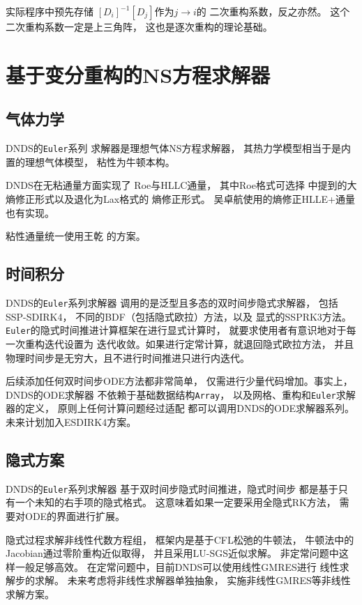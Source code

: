 \documentclass[UTF8,zihao=5]{ctexart} %
\begin{document}
实际程序中预先存储
$[D_i]^{-1}[D_j]$作为$j\rightarrow i$的
二次重构系数，反之亦然。
这个二次重构系数一定是上三角阵，
这也是逐次重构的理论基础。



\section{基于变分重构的NS方程求解器}

\subsection{气体力学}

DNDS的\verb|Euler|系列
求解器是理想气体NS方程求解器，
其热力学模型相当于是内置的理想气体模型，
粘性为牛顿本构。

DNDS在无粘通量方面实现了
Roe与HLLC通量\cite{toro2013Riemann}，
其中Roe格式可选择\cite{fleischmann2020low}
中提到的大熵修正形式以及退化为Lax格式的
熵修正形式。
吴卓航使用的熵修正HLLE+通量也有实现。

粘性通量统一使用王乾
的方案\cite{wang2016compact2}。

\subsection{时间积分}

DNDS的\verb|Euler|系列求解器
调用的是泛型且多态的双时间步隐式求解器，
包括SSP-SDIRK4\cite{ferracina2008strong}，
不同的BDF（包括隐式欧拉）方法，以及
显式的SSPRK3方法。
\verb|Euler|的隐式时间推进计算框架在进行显式计算时，
就要求使用者有意识地对于每一次重构迭代设置为
迭代收敛。如果进行定常计算，就退回隐式欧拉方法，
并且物理时间步是无穷大，且不进行时间推进只进行内迭代。

后续添加任何双时间步ODE方法都非常简单，
仅需进行少量代码增加。事实上，DNDS的ODE求解器
不依赖于基础数据结构\verb|Array|，
以及网格、重构和\verb|Euler|求解器的定义，
原则上任何计算问题经过适配
都可以调用DNDS的ODE求解器系列。
未来计划加入ESDIRK4方案。

\subsection{隐式方案}

DNDS的\verb|Euler|系列求解器
基于双时间步隐式时间推进，隐式时间步
都是基于只有一个未知的右手项的隐式格式。
这意味着如果一定要采用全隐式RK方法，
需要对ODE的界面进行扩展。

隐式过程求解非线性代数方程组，
框架内是基于CFL松弛的牛顿法，
牛顿法中的Jacobian通过零阶重构近似取得，
并且采用LU-SGS近似求解。
非定常问题中这样一般足够高效。
在定常问题中，目前DNDS可以使用线性GMRES进行
线性求解步的求解。
未来考虑将非线性求解器单独抽象，
实施非线性GMRES等非线性求解方案。
    
\end{document}
